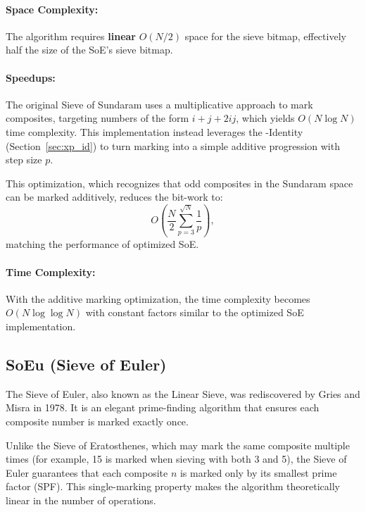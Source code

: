 \documentclass{article}
\begin{document}
\paragraph{Space Complexity:} 
The algorithm requires \textbf{linear} $O(N/2)$ space for the sieve bitmap, effectively half the size of the SoE's sieve bitmap.

\paragraph{Speedups:}
The original Sieve of Sundaram uses a multiplicative approach to mark composites, targeting numbers of the form $i + j + 2ij$, which yields $O(N \log N)$ time complexity. This implementation instead leverages the \Xp-Identity (Section~\ref{sec:xp_id}) to turn marking into a simple additive progression with step size $p$.

This optimization, which recognizes that odd composites in the Sundaram space can be marked additively, reduces the bit-work to:
\[
O\left(\frac{N}{2}\sum_{p=3}^{\sqrt N}\frac{1}{p}\right),
\]
matching the performance of optimized SoE.

\paragraph{Time Complexity:} With the additive marking optimization, the time complexity becomes $O(N \log \log N)$ with constant factors similar to the optimized SoE implementation.

\subsection{SoEu (Sieve of Euler)} \label{alg:soeu}

The Sieve of Euler, also known as the Linear Sieve, was rediscovered by Gries and Misra in 1978. It is an elegant prime-finding algorithm that ensures each composite number is marked exactly once. 

Unlike the Sieve of Eratosthenes, which may mark the same composite multiple times (for example, 15 is marked when sieving with both 3 and 5), the Sieve of Euler guarantees that each composite $n$ is marked only by its smallest prime factor (SPF).
This single-marking property makes the algorithm theoretically linear in the number of operations. 
\end{document}
